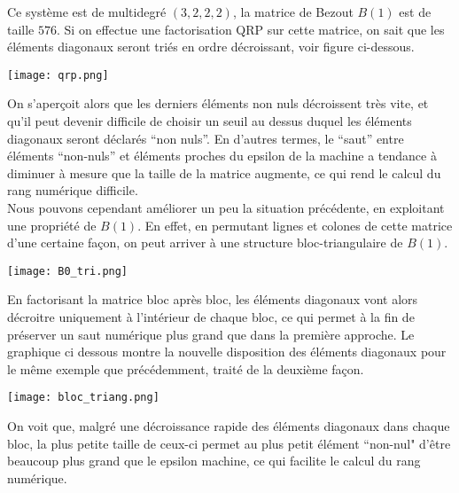 \documentclass{standalone}
\begin{document}
Ce système est de multidegré $(3, 2, 2, 2)$, la matrice de Bezout $B(1)$ est de taille $576$. Si on effectue une factorisation QRP sur cette matrice, on sait que les éléments diagonaux seront triés en ordre décroissant, voir figure ci-dessous.
\begin{center}
\texttt{[image: qrp.png]}
\end{center}
 On s'aperçoit alors que les derniers éléments non nuls décroissent très vite, et qu'il peut devenir difficile de choisir un seuil au dessus duquel les éléments diagonaux seront déclarés ``non nuls''.
En d'autres termes, le ``saut'' entre éléments ``non-nuls'' et éléments proches du epsilon de la machine a tendance à diminuer à mesure que la taille de la matrice augmente, ce qui rend le calcul du rang numérique difficile.\\
Nous pouvons cependant améliorer un peu la situation précédente, en exploitant une propriété de $B(1)$. En effet, en permutant lignes et colones de cette matrice d'une certaine façon, on peut arriver à une structure bloc-triangulaire de $B(1)$.
\begin{center}
\texttt{[image: B0\_tri.png]}
\end{center}
En factorisant la matrice bloc après bloc, les éléments diagonaux vont alors décroitre uniquement à l'intérieur de chaque bloc, ce qui permet à la fin de préserver un saut numérique plus grand que dans la première approche. Le graphique ci dessous montre la nouvelle disposition des éléments diagonaux pour le même exemple que précédemment, traité de la deuxième façon.
\begin{center}
\texttt{[image: bloc\_triang.png]}
\end{center}
On voit que, malgré une décroissance rapide des éléments diagonaux dans chaque bloc, la plus petite taille de ceux-ci permet au plus petit élément ``non-nul" d'être beaucoup plus grand que le epsilon machine, ce qui facilite le calcul du rang numérique.
\end{document}
